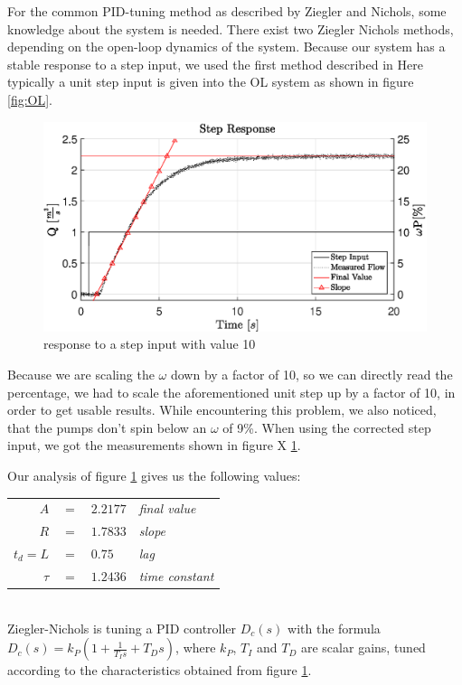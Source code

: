 For the common PID-tuning method as described by Ziegler and Nichols,
some knowledge about the system is needed.
There exist two Ziegler Nichols methods,
depending on the open-loop dynamics of the system.
Because our system has a stable response to a step input, we used the first method described in 
Here typically a unit step input is given into the OL system as shown in figure \ref{fig:OL}.

\begin{figure}[H]
    \centering
    \includegraphics[width=\textwidth]{figures/07controllerDesign/StepResponseLabeled.eps}
    \caption{response to a step input with value 10}
	\label{fig:stepin}
\end{figure}

Because we are scaling the $\omega$ down by a factor of 10, so we can directly read the percentage,
we had to scale the aforementioned unit step up by a factor of 10,
in order to get usable results.
While encountering this problem, we also noticed, that the pumps don't spin below an $\omega$ of 9\%.
When using the corrected step input, we got the measurements shown in figure X \ref{fig:stepin}.

Our analysis of figure \ref{fig:stepin} gives us the following values:
\\
\begin{tabular}{r c l l}
	$A$ 	& $=$ & $2.2177$ 	& \footnotesize{\textit{final value}}\\
	$R$ 	& $=$ & $1.7833$ 	& \footnotesize{\textit{slope}}\\
	$t_d=L$	& $=$ & $0.75$ 		& \footnotesize{\textit{lag}}\\
	$\tau$ 	& $=$ & $1.2436$ 	& \footnotesize{\textit{time constant}}
\end{tabular}
\\
Ziegler-Nichols is tuning a PID controller $D_c(s)$ with the formula\\
$D_c(s)=k_P(1+ \frac{1}{T_Is}+T_Ds)$,
where $k_P$, $T_I$ and $T_D$ are scalar gains,
tuned according to the characteristics obtained from figure \ref{fig:stepin}.

